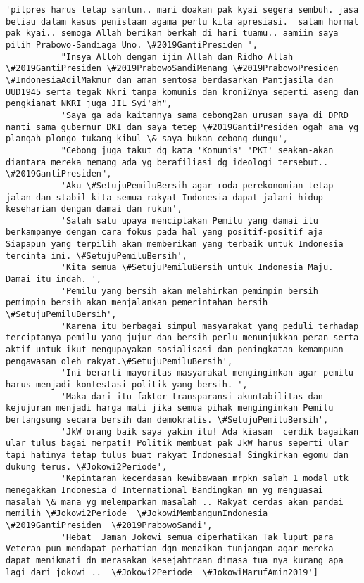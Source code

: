 \documentclass[11pt]{article}
\begin{document}
\begin{Verbatim}[commandchars=\\\{\}]
           'pilpres harus tetap santun.. mari doakan pak kyai segera sembuh. jasa beliau dalam kasus penistaan agama perlu kita apresiasi.  salam hormat pak kyai.. semoga Allah berikan berkah di hari tuamu.. aamiin saya pilih Prabowo-Sandiaga Uno. \#2019GantiPresiden ',
           "Insya Alloh dengan ijin Allah dan Ridho Allah \#2019GantiPresiden \#2019PrabowoSandiMenang \#2019PrabowoPresiden \#IndonesiaAdilMakmur dan aman sentosa berdasarkan Pantjasila dan UUD1945 serta tegak Nkri tanpa komunis dan kroni2nya seperti aseng dan pengkianat NKRI juga JIL Syi'ah",
           'Saya ga ada kaitannya sama cebong2an urusan saya di DPRD nanti sama gubernur DKI dan saya tetep \#2019GantiPresiden ogah ama yg plangah plongo tukang kibul \& saya bukan cebong dungu',
           "Cebong juga takut dg kata 'Komunis' 'PKI' seakan-akan diantara mereka memang ada yg berafiliasi dg ideologi tersebut..  \#2019GantiPresiden",
           'Aku \#SetujuPemiluBersih agar roda perekonomian tetap jalan dan stabil kita semua rakyat Indonesia dapat jalani hidup keseharian dengan damai dan rukun',
           'Salah satu upaya menciptakan Pemilu yang damai itu berkampanye dengan cara fokus pada hal yang positif-positif aja  Siapapun yang terpilih akan memberikan yang terbaik untuk Indonesia tercinta ini. \#SetujuPemiluBersih',
           'Kita semua \#SetujuPemiluBersih untuk Indonesia Maju. Damai itu indah. ',
           'Pemilu yang bersih akan melahirkan pemimpin bersih pemimpin bersih akan menjalankan pemerintahan bersih \#SetujuPemiluBersih',
           'Karena itu berbagai simpul masyarakat yang peduli terhadap terciptanya pemilu yang jujur dan bersih perlu menunjukkan peran serta aktif untuk ikut mengupayakan sosialisasi dan peningkatan kemampuan pengawasan oleh rakyat.\#SetujuPemiluBersih',
           'Ini berarti mayoritas masyarakat menginginkan agar pemilu harus menjadi kontestasi politik yang bersih. ',
           'Maka dari itu faktor transparansi akuntabilitas dan kejujuran menjadi harga mati jika semua pihak menginginkan Pemilu berlangsung secara bersih dan demokratis. \#SetujuPemiluBersih',
           'JkW orang baik saya yakin itu! Ada kiasan  cerdik bagaikan ular tulus bagai merpati! Politik membuat pak JkW harus seperti ular tapi hatinya tetap tulus buat rakyat Indonesia! Singkirkan egomu dan dukung terus. \#Jokowi2Periode',
           'Kepintaran kecerdasan kewibawaan mrpkn salah 1 modal utk menegakkan Indonesia d International Bandingkan mn yg menguasai masalah \& mana yg melemparkan masalah .. Rakyat cerdas akan pandai memilih \#Jokowi2Periode  \#JokowiMembangunIndonesia  \#2019GantiPresiden  \#2019PrabowoSandi',
           'Hebat  Jaman Jokowi semua diperhatikan Tak luput para Veteran pun mendapat perhatian dgn menaikan tunjangan agar mereka dapat menikmati dn merasakan kesejahtraan dimasa tua nya kurang apa lagi dari jokowi ..  \#Jokowi2Periode  \#JokowiMarufAmin2019']
\end{Verbatim}
            
\end{document}
